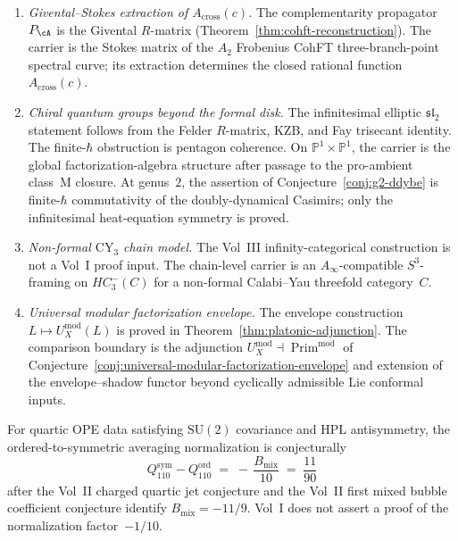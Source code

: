 \begin{enumerate}[label=\textup{(\arabic*)}]
 For the conformally flat disk, metric independence is
 proved for Heisenberg by Moriwaki's Bergman-space Fredholm
 determinant; the interacting case is decided by the same norm carrier.
\item \emph{Givental--Stokes extraction of
 $A_{\mathrm{cross}}(c)$.} The complementarity propagator~$P_\cA$ is
 the Givental $R$-matrix
 \textup{(}Theorem~\ref{thm:cohft-reconstruction}\textup{)}. The
 carrier is the Stokes matrix of the $A_2$ Frobenius CohFT
 three-branch-point spectral curve; its extraction determines the
 closed rational function $A_{\mathrm{cross}}(c)$.
\item \emph{Chiral quantum groups beyond the formal disk.} The
 infinitesimal elliptic $\mathfrak{sl}_2$ statement follows from the
 Felder $R$-matrix, KZB, and Fay trisecant identity. The
 finite-$\hbar$ obstruction is pentagon coherence. On
 $\mathbb P^1\times\mathbb P^1$, the carrier is the global
 factorization-algebra structure after passage to the pro-ambient
 class~M closure. At genus~$2$, the assertion of
 Conjecture~\ref{conj:g2-ddybe} is finite-$\hbar$ commutativity of
 the doubly-dynamical Casimirs; only the infinitesimal heat-equation
 symmetry is proved.
\item \emph{Non-formal $\mathrm{CY}_3$ chain model.} The Vol~III
 infinity-categorical construction is not a Vol~I proof input. The
 chain-level carrier is an
 $A_\infty$-compatible $S^3$-framing on $HC^-_3(C)$ for a non-formal
 Calabi--Yau threefold category~$C$.
\item \emph{Universal modular factorization envelope.} The envelope
 construction $L\mapsto U_X^{\mathrm{mod}}(L)$ is proved in
 Theorem~\ref{thm:platonic-adjunction}. The comparison boundary is the
 adjunction
 $U_X^{\mathrm{mod}}\dashv\operatorname{Prim}^{\mathrm{mod}}$
 of Conjecture~\ref{conj:universal-modular-factorization-envelope}
 and extension of the envelope--shadow functor beyond cyclically
 admissible Lie conformal inputs.
\end{enumerate}

\begin{conjecture}
\label{conj:celestial-cross-conjecture-vol1}
\ClaimStatusConjectured
{}
For quartic OPE data satisfying $\mathrm{SU}(2)$ covariance and HPL
antisymmetry, the ordered-to-symmetric averaging normalization is
conjecturally
\begin{equation}\label{eq:celestial-cross-conjecture}
Q^{\mathrm{sym}}_{110} - Q^{\mathrm{ord}}_{110}
\;=\;
-\,\frac{B_{\mathrm{mix}}}{10}
\;=\;
\frac{11}{90}
\end{equation}
after the Vol~II charged quartic jet conjecture and the Vol~II first
mixed bubble coefficient conjecture identify
$B_{\mathrm{mix}}=-11/9$. Vol~I does not assert a proof of the
normalization factor~$-1/10$.
\end{conjecture}

